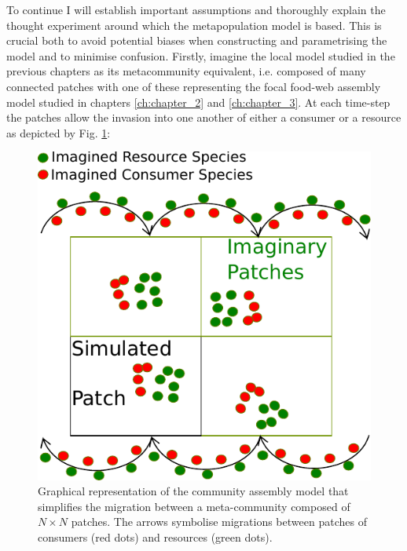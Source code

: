 \documentclass[a4paper]{report}
\begin{document}
{  To continue I will establish important assumptions and thoroughly explain the thought experiment around which the metapopulation model is based. This is crucial both to avoid potential biases when constructing and parametrising the model and to minimise confusion. Firstly, imagine the local model studied in the previous chapters as its metacommunity equivalent, i.e. composed of many connected patches with one of these representing
the focal food-web assembly model studied in chapters \ref{ch:chapter_2} and \ref{ch:chapter_3}. At each time-step the patches allow the invasion into one another of either a consumer or a resource as depicted by Fig. \ref{fig:topology_2}:

\begin{figure}[H]
\centering{}
\includegraphics[scale=1]{../Images/topology_2.pdf}
\caption{Graphical representation of the community assembly model that simplifies the migration between a meta-community composed of $N \times N$ patches. The arrows symbolise migrations between patches of consumers (red dots) and resources (green dots). \label{fig:topology_2}}
\end{figure}

}
\end{document}
